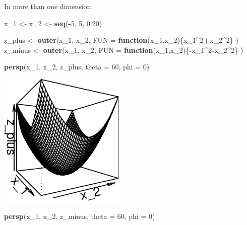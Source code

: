 \documentclass[11pt,]{article}
\newenvironment{Shaded}{\begin{snugshade}}{\end{snugshade}}
\newcommand{\KeywordTok}[1]{\textcolor[rgb]{0.13,0.29,0.53}{\textbf{#1}}}
\newcommand{\DataTypeTok}[1]{\textcolor[rgb]{0.13,0.29,0.53}{#1}}
\newcommand{\DecValTok}[1]{\textcolor[rgb]{0.00,0.00,0.81}{#1}}
\newcommand{\FloatTok}[1]{\textcolor[rgb]{0.00,0.00,0.81}{#1}}
\newcommand{\StringTok}[1]{\textcolor[rgb]{0.31,0.60,0.02}{#1}}
\newcommand{\ControlFlowTok}[1]{\textcolor[rgb]{0.13,0.29,0.53}{\textbf{#1}}}
\newcommand{\OperatorTok}[1]{\textcolor[rgb]{0.81,0.36,0.00}{\textbf{#1}}}
\newcommand{\NormalTok}[1]{#1}
\begin{document}
In more than one dimension:

\begin{Shaded}
\begin{Highlighting}[]
\NormalTok{x_}\DecValTok{1}\NormalTok{ <-}\StringTok{ }\NormalTok{x_}\DecValTok{2}\NormalTok{ <-}\StringTok{ }\KeywordTok{seq}\NormalTok{(}\OperatorTok{-}\DecValTok{5}\NormalTok{, }\DecValTok{5}\NormalTok{, }\FloatTok{0.20}\NormalTok{)}

\NormalTok{z_plus <-}\StringTok{ }\KeywordTok{outer}\NormalTok{(x_}\DecValTok{1}\NormalTok{, x_}\DecValTok{2}\NormalTok{, }
                \DataTypeTok{FUN =} \ControlFlowTok{function}\NormalTok{(x_}\DecValTok{1}\NormalTok{,x_}\DecValTok{2}\NormalTok{)\{x_}\DecValTok{1}\OperatorTok{^}\DecValTok{2}\OperatorTok{+}\NormalTok{x_}\DecValTok{2}\OperatorTok{^}\DecValTok{2}\NormalTok{\}}
\NormalTok{                )}
\NormalTok{z_minus <-}\StringTok{ }\KeywordTok{outer}\NormalTok{(x_}\DecValTok{1}\NormalTok{, x_}\DecValTok{2}\NormalTok{,}
                 \DataTypeTok{FUN =} \ControlFlowTok{function}\NormalTok{(x_}\DecValTok{1}\NormalTok{,x_}\DecValTok{2}\NormalTok{)\{}\OperatorTok{-}\NormalTok{x_}\DecValTok{1}\OperatorTok{^}\DecValTok{2}\OperatorTok{-}\NormalTok{x_}\DecValTok{2}\OperatorTok{^}\DecValTok{2}\NormalTok{\}}
\NormalTok{                 )}

\KeywordTok{persp}\NormalTok{(x_}\DecValTok{1}\NormalTok{, x_}\DecValTok{2}\NormalTok{, z_plus, }\DataTypeTok{theta =} \DecValTok{60}\NormalTok{, }\DataTypeTok{phi =} \DecValTok{0}\NormalTok{)}
\end{Highlighting}
\end{Shaded}

\begin{center}\includegraphics{Optimization_files/figure-latex/FOC_dim_2-1} \end{center}

\begin{Shaded}
\begin{Highlighting}[]
\KeywordTok{persp}\NormalTok{(x_}\DecValTok{1}\NormalTok{, x_}\DecValTok{2}\NormalTok{, z_minus, }\DataTypeTok{theta =} \DecValTok{60}\NormalTok{, }\DataTypeTok{phi =} \DecValTok{0}\NormalTok{)}
\end{Highlighting}
\end{Shaded}
\end{document}
